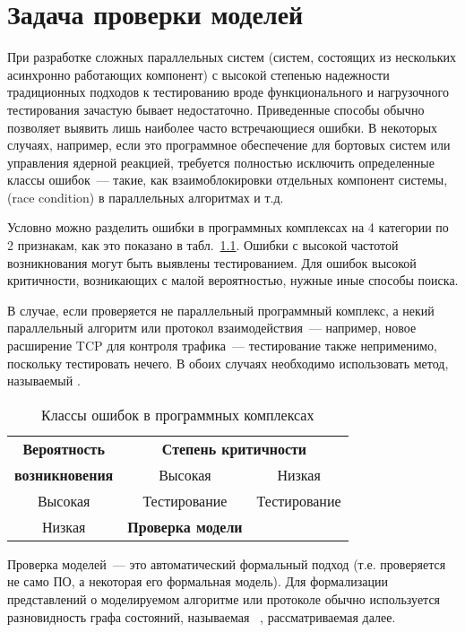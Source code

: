 \chapter{Задача проверки моделей}
\label{cha:model-checking}

При разработке сложных параллельных систем (систем, состоящих из нескольких асинхронно
работающих компонент) с высокой степенью надежности традиционных подходов к тестированию
вроде функционального и нагрузочного тестирования зачастую бывает
недостаточно. Приведенные способы обычно позволяет выявить лишь наиболее часто
встречающиеся ошибки. В некоторых случаях, например, если это программное обеспечение для
бортовых систем или управления ядерной реакцией, требуется полностью исключить
определенные классы ошибок~--- такие, как взаимоблокировки отдельных компонент системы,
 (race condition) в параллельных алгоритмах и т.д.

Условно можно разделить ошибки в программных комплексах на 4 категории по 2 признакам, как
это показано в табл.~\ref{tab:error-classes}. Ошибки с высокой частотой возникнования
могут быть выявлены тестированием. Для ошибок высокой критичности, возникающих с малой
вероятностью, нужные иные способы поиска.

В случае, если проверяется не параллельный программный комплекс, а некий параллельный
алгоритм или протокол взаимодействия~--- например, новое расширение TCP для контроля
трафика~--- тестирование также неприменимо, поскольку тестировать нечего. В обоих случаях
необходимо использовать метод, называемый .

\begin{table}[hb]
  \centering
  \begin{tabular}{|c|c|c|} \hline
    \textbf{Вероятность} & \multicolumn{2}{|c|}{\bf Степень критичности} \\ \cline{2-3}
    \textbf{возникновения} & Высокая & Низкая \\ \hline
    Высокая & Тестирование & Тестирование \\  \hline
    Низкая  & \textbf{Проверка модели} &  \\  \hline
  \end{tabular}  \caption{Классы ошибок в программных комплексах}
  \label{tab:error-classes}
\end{table}

Проверка моделей~--- это автоматический формальный подход (т.е. проверяется не само ПО, а
некоторая его формальная модель). Для формализации представлений о моделируемом алгоритме
или протоколе обычно используется разновидность графа состояний, называемая ~\cite{Clarke}, рассматриваемая далее.

